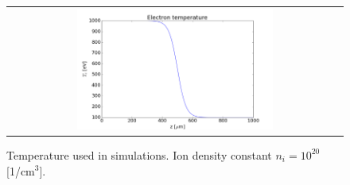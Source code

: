 \documentclass[preprint,12pt]{elsarticle}
\begin{document}
\begin{figure}[tbh]
  \begin{center}
    \begin{tabular}{c}
      \includegraphics[width=0.6\textwidth]{../results/fe_analysis/figs/P5_temperature.png} 
    \end{tabular}
  \caption{
  Temperature used in simulations. 
  Ion density constant $n_i = 10^{20}$ [1/cm$^3$].
  }
  \end{center}
  \label{fig:P5_temperarute}
\end{figure}
\end{document}
